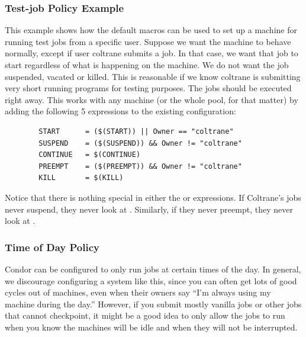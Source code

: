 \subsubsection{\label{sec:Test-job Policy Example}
Test-job Policy Example}

This example shows how the default macros can be used to
set up a machine for running test jobs from a specific user.
Suppose we want the machine to
behave normally, except if user coltrane submits a job.
In that case, we
want that job to start regardless of what is happening on the machine.
We do not want the job suspended, vacated or killed.
This is reasonable if 
we know coltrane is submitting very short
running programs for testing purposes. 
The jobs should be executed right away.
This works with any machine
(or the whole pool, for that matter) by adding the following 5 expressions
to the existing configuration:
\begin{verbatim}
        START      = ($(START)) || Owner == "coltrane"
        SUSPEND    = ($(SUSPEND)) && Owner != "coltrane"
        CONTINUE   = $(CONTINUE)
        PREEMPT    = ($(PREEMPT)) && Owner != "coltrane"
        KILL       = $(KILL)
\end{verbatim}
Notice that there is nothing special in either the
 or  expressions.
If Coltrane's jobs never suspend, they never look at .  
Similarly, if they never preempt, they never look at . 


\subsubsection{\label{sec:Time of Day Policy}
Time of Day Policy}

Condor can be
configured to only run jobs at
certain times of the day.
In general, we discourage configuring a system like this, since you
can often get lots of good cycles out of machines, even when their
owners say ``I'm always using my machine during the day.''
However, if you submit mostly vanilla jobs or other jobs that cannot
checkpoint, it might be a good idea to only allow the jobs to run when
you know the machines will be idle and when they will not be
interrupted.


